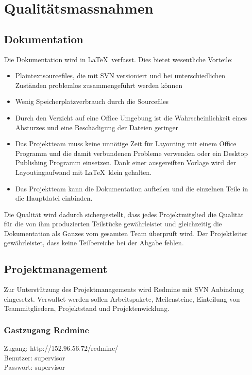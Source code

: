 \chapter{Qualitätsmassnahmen}

\section{Dokumentation}
Die Dokumentation wird in \LaTeX\ verfasst. Dies bietet wesentliche Vorteile:
\begin{itemize}
	\setlength{\itemsep}{-\parsep}
	\item Plaintextsourcefiles, die mit SVN versioniert und bei unterschiedlichen Zuständen problemlos zusammengeführt werden können
	\item Wenig Speicherplatzverbrauch durch die Sourcefiles
	\item Durch den Verzicht auf eine Office Umgebung ist die Wahrscheinlichkeit eines Absturzes und eine Beschädigung der Dateien geringer
	\item Das Projektteam muss keine unnötige Zeit für Layouting mit einem Office Programm und die damit verbundenen Probleme verwenden oder ein Desktop Publishing Programm einsetzen. Dank einer ausgereiften Vorlage wird der Layoutingaufwand mit \LaTeX\ klein gehalten.
	\item Das Projektteam kann die Dokumentation aufteilen und die einzelnen Teile in die Hauptdatei einbinden.
\end{itemize}
Die Qualität wird dadurch sichergestellt, dass jedes Projektmitglied die Qualität für die von ihm produzierten Teilstücke gewährleistet und gleichzeitig die Dokumentation als Ganzes vom gesamten Team überprüft wird. Der Projektleiter gewährleistet, dass keine Teilbereiche bei der Abgabe fehlen.

\section{Projektmanagement}
Zur Unterstützung des Projektmanagements wird Redmine mit SVN Anbindung eingesetzt. Verwaltet werden sollen Arbeitspakete, Meilensteine, Einteilung von Teammitgliedern, Projektstand und Projektenwicklung.

\subsection{Gastzugang Redmine}
\label{text:redmine}
Zugang: http://152.96.56.72/redmine/\\
Benutzer: supervisor\\
Passwort: supervisor \\

